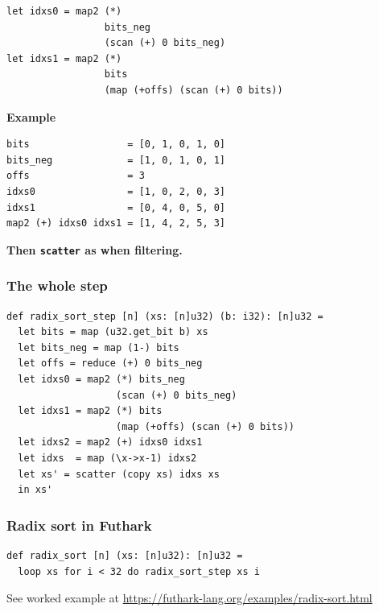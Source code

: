 \begin{frame}[fragile]

\begin{lstlisting}
let idxs0 = map2 (*)
                 bits_neg
                 (scan (+) 0 bits_neg)
let idxs1 = map2 (*)
                 bits
                 (map (+offs) (scan (+) 0 bits))
\end{lstlisting}

\pause

  \begin{block}{\textbf{Example}}

\begin{lstlisting}
bits                 = [0, 1, 0, 1, 0]
bits_neg             = [1, 0, 1, 0, 1]
offs                 = 3
idxs0                = [1, 0, 2, 0, 3]
idxs1                = [0, 4, 0, 5, 0]
map2 (+) idxs0 idxs1 = [1, 4, 2, 5, 3]
\end{lstlisting}
  \end{block}

\textbf{Then \texttt{scatter} as when filtering.}

\end{frame}

\begin{frame}[fragile]
  \frametitle{The whole step}

\begin{lstlisting}
def radix_sort_step [n] (xs: [n]u32) (b: i32): [n]u32 =
  let bits = map (u32.get_bit b) xs
  let bits_neg = map (1-) bits
  let offs = reduce (+) 0 bits_neg
  let idxs0 = map2 (*) bits_neg
                   (scan (+) 0 bits_neg)
  let idxs1 = map2 (*) bits
                   (map (+offs) (scan (+) 0 bits))
  let idxs2 = map2 (+) idxs0 idxs1
  let idxs  = map (\x->x-1) idxs2
  let xs' = scatter (copy xs) idxs xs
  in xs'
\end{lstlisting}

\end{frame}

\begin{frame}[fragile]
  \frametitle{Radix sort in Futhark}

\begin{lstlisting}
def radix_sort [n] (xs: [n]u32): [n]u32 =
  loop xs for i < 32 do radix_sort_step xs i
\end{lstlisting}

  See worked example at
  \url{https://futhark-lang.org/examples/radix-sort.html}

\end{frame}

